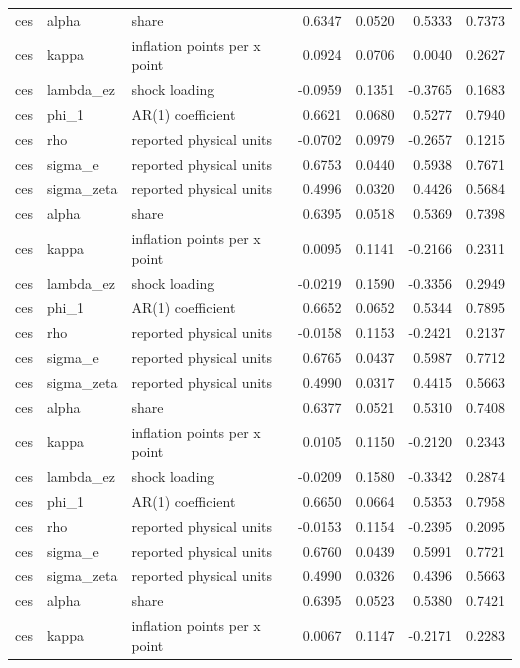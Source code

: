 \begin{tabular}{lllrrrr}
ces & alpha & share & 0.6347 & 0.0520 & 0.5333 & 0.7373 \\
ces & kappa & inflation points per x point & 0.0924 & 0.0706 & 0.0040 & 0.2627 \\
ces & lambda\_ez & shock loading & -0.0959 & 0.1351 & -0.3765 & 0.1683 \\
ces & phi\_1 & AR(1) coefficient & 0.6621 & 0.0680 & 0.5277 & 0.7940 \\
ces & rho & reported physical units & -0.0702 & 0.0979 & -0.2657 & 0.1215 \\
ces & sigma\_e & reported physical units & 0.6753 & 0.0440 & 0.5938 & 0.7671 \\
ces & sigma\_zeta & reported physical units & 0.4996 & 0.0320 & 0.4426 & 0.5684 \\
ces & alpha & share & 0.6395 & 0.0518 & 0.5369 & 0.7398 \\
ces & kappa & inflation points per x point & 0.0095 & 0.1141 & -0.2166 & 0.2311 \\
ces & lambda\_ez & shock loading & -0.0219 & 0.1590 & -0.3356 & 0.2949 \\
ces & phi\_1 & AR(1) coefficient & 0.6652 & 0.0652 & 0.5344 & 0.7895 \\
ces & rho & reported physical units & -0.0158 & 0.1153 & -0.2421 & 0.2137 \\
ces & sigma\_e & reported physical units & 0.6765 & 0.0437 & 0.5987 & 0.7712 \\
ces & sigma\_zeta & reported physical units & 0.4990 & 0.0317 & 0.4415 & 0.5663 \\
ces & alpha & share & 0.6377 & 0.0521 & 0.5310 & 0.7408 \\
ces & kappa & inflation points per x point & 0.0105 & 0.1150 & -0.2120 & 0.2343 \\
ces & lambda\_ez & shock loading & -0.0209 & 0.1580 & -0.3342 & 0.2874 \\
ces & phi\_1 & AR(1) coefficient & 0.6650 & 0.0664 & 0.5353 & 0.7958 \\
ces & rho & reported physical units & -0.0153 & 0.1154 & -0.2395 & 0.2095 \\
ces & sigma\_e & reported physical units & 0.6760 & 0.0439 & 0.5991 & 0.7721 \\
ces & sigma\_zeta & reported physical units & 0.4990 & 0.0326 & 0.4396 & 0.5663 \\
ces & alpha & share & 0.6395 & 0.0523 & 0.5380 & 0.7421 \\
ces & kappa & inflation points per x point & 0.0067 & 0.1147 & -0.2171 & 0.2283 \\

\end{tabular}
